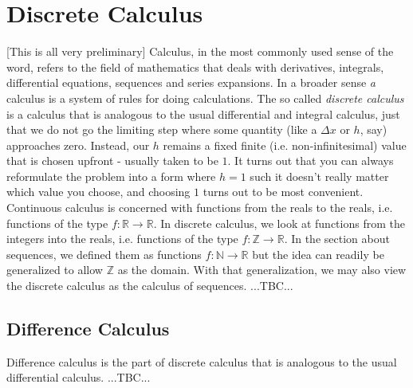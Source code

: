 \chapter{Discrete Calculus}
[This is all very preliminary] Calculus, in the most commonly used sense of the word, refers to the field of mathematics that deals with derivatives, integrals, differential equations, sequences and series expansions. In a broader sense \emph{a} calculus is a system of rules for doing calculations. The so called \emph{discrete calculus} is a calculus that is analogous to the usual differential and integral calculus, just that we do not go the limiting step where some quantity (like a $\Delta x$ or $h$, say) approaches zero. Instead, our $h$ remains a fixed finite (i.e. non-infinitesimal) value that is chosen upfront - usually taken to be $1$. It turns out that you can always reformulate the problem into a form where $h = 1$ such it doesn't really matter which value you choose, and choosing $1$ turns out to be most convenient. Continuous calculus is concerned with functions from the reals to the reals, i.e. functions of the type $f: \mathbb{R} \rightarrow \mathbb{R}$. In discrete calculus, we look at functions from the integers into the reals, i.e. functions of the type $f: \mathbb{Z} \rightarrow \mathbb{R}$. In the section about sequences, we defined them as functions $f: \mathbb{N} \rightarrow \mathbb{R}$ but the idea can readily be generalized to allow $\mathbb{Z}$ as the domain. With that generalization, we may also view the discrete calculus as the calculus of sequences. ...TBC...




\section{Difference Calculus}
Difference calculus is the part of discrete calculus that is analogous to the usual differential calculus. ...TBC...


